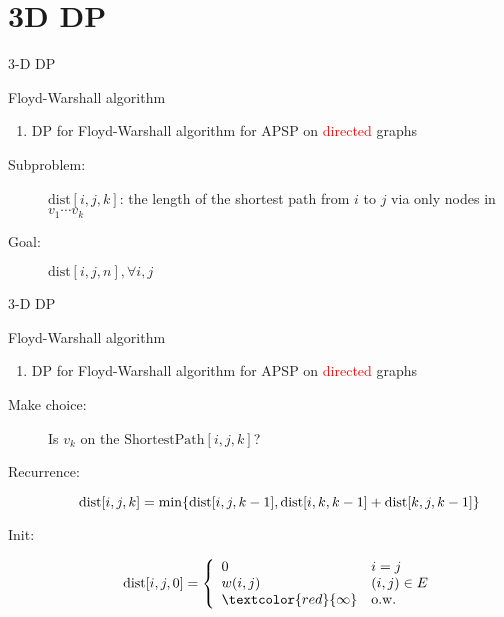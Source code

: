 \section{3D DP}

\begin{frame}{3-D DP}
  \begin{exampleblock}{Floyd-Warshall algorithm}
	\begin{enumerate}[(1)]
	  \item DP for Floyd-Warshall algorithm for APSP on \textcolor{red}{directed} graphs
	\end{enumerate}
  \end{exampleblock}

  \begin{description}
	\item[Subproblem:] $\text{dist}[i,j,k]$: the length of the shortest path from $i$ to $j$ via only nodes in $v_{1} \cdots v_{k}$
	\item[Goal:] $\text{dist}[i,j,n], \forall i,j$
  \end{description}
\end{frame}
\begin{frame}{3-D DP}
  \begin{exampleblock}{Floyd-Warshall algorithm}
	\begin{enumerate}[(1)]
	  \item DP for Floyd-Warshall algorithm for APSP on \textcolor{red}{directed} graphs
	\end{enumerate}
  \end{exampleblock}

  \begin{description}
	\item[Make choice:] Is $v_{k}$ on the $\text{ShortestPath}[i,j,k]$?
	\item[Recurrence:] 
	  \[
		\text{dist}[i,j,k] = \min \{\text{dist}[i,j,k-1], \text{dist}[i,k,k-1] + \text{dist}[k,j,k-1]\}
	  \]

	  \pause
	\item[Init:]
	  \[
		\text{dist}[i,j,0] = \left\{\begin{array}{ll}
		  0 & i = j \\
		  w(i,j) & (i,j) \in E \\
		  \textcolor{red}{\infty} & \text{o.w.}
		\end{array} \right.
	  \]
  \end{description}
\end{frame}
